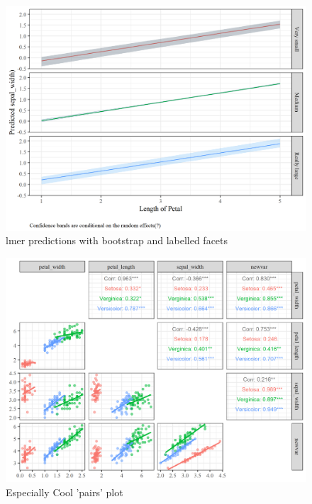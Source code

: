 \documentclass[]{elsarticle} %
\begin{document}
\begin{figure}[H]

{\centering \includegraphics[width=0.9\linewidth]{cookbook_files/figure-latex/lmer_predictions-1} 

}

\caption{lmer predictions with bootstrap and labelled facets}\label{fig:lmer_predictions}
\end{figure}

\begin{figure}[H]

{\centering \includegraphics[width=0.9\linewidth]{cookbook_files/figure-latex/ggpairs_plot-1} 

}

\caption{Especially Cool 'pairs' plot}\label{fig:ggpairs_plot}
\end{figure}

\FloatBarrier
\newpage
\end{document}
